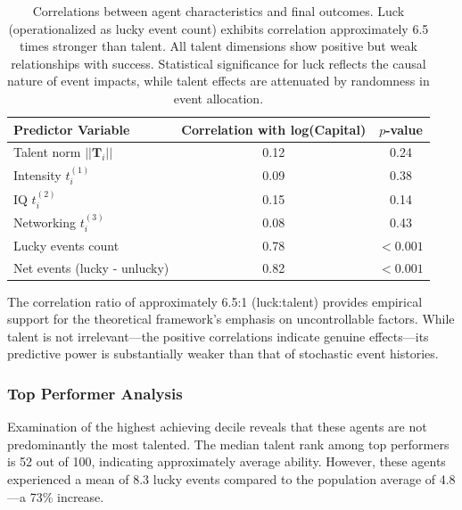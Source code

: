 \begin{table}[H]
  \centering
  \begin{tabular}{lcc}
    \toprule \textbf{Predictor Variable}      & \textbf{Correlation with log(Capital)} & \textbf{$p$-value} \\
    \midrule Talent norm $||\mathbf{T}_{i}||$ & 0.12                                   & 0.24               \\
    Intensity $t_{i}^{(1)}$                   & 0.09                                   & 0.38               \\
    IQ $t_{i}^{(2)}$                          & 0.15                                   & 0.14               \\
    Networking $t_{i}^{(3)}$                  & 0.08                                   & 0.43               \\
    Lucky events count                        & 0.78                                   & $<0.001$           \\
    Net events (lucky - unlucky)              & 0.82                                   & $<0.001$           \\
    \bottomrule
  \end{tabular}
  \caption{Correlations between agent characteristics and final outcomes.
  Luck (operationalized as lucky event count) exhibits correlation approximately
  6.5 times stronger than talent. All talent dimensions show positive
  but weak relationships with success. Statistical significance for luck
  reflects the causal nature of event impacts, while talent effects are
  attenuated by randomness in event allocation.}
  \label{tab:correlations}
\end{table}

The correlation ratio of approximately 6.5:1 (luck:talent) provides
empirical support for the theoretical framework's emphasis on
uncontrollable factors. While talent is not irrelevant—the positive correlations
indicate genuine effects—its predictive power is substantially weaker than
that of stochastic event histories.

\subsubsection{Top Performer Analysis}

Examination of the highest achieving decile reveals that these agents
are not predominantly the most talented. The median talent rank among top
performers is 52 out of 100, indicating approximately average ability. However,
these agents experienced a mean of 8.3 lucky events compared to the
population average of 4.8—a 73\% increase.

